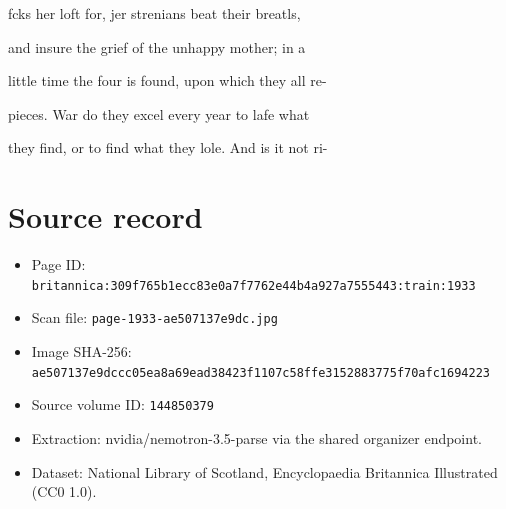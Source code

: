 \documentclass{article}
\begin{document}
fcks her loft for, jer strenians beat their breatls,

and insure the grief of the unhappy mother; in a

little time the four is found, upon which they all re-

pieces. War do they excel every year to lafe what

they find, or to find what they lole. And is it not ri-

\section*{Source record}
\begin{itemize}
\item Page ID: \texttt{britannica:309f765b1ecc83e0a7f7762e44b4a927a7555443:train:1933}
\item Scan file: \texttt{page-1933-ae507137e9dc.jpg}
\item Image SHA-256: \texttt{ae507137e9dccc05ea8a69ead38423f1107c58ffe3152883775f70afc1694223}
\item Source volume ID: \texttt{144850379}
\item Extraction: nvidia/nemotron-3.5-parse via the shared organizer endpoint.
\item Dataset: National Library of Scotland, Encyclopaedia Britannica Illustrated (CC0 1.0).
\end{itemize}
\end{document}
